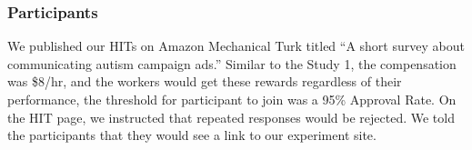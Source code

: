
\subsubsection{Participants}
We published our HITs on Amazon Mechanical Turk titled ``A short survey about communicating autism campaign ads.'' Similar to the Study 1, the compensation was \$8/hr, and the workers would get these rewards regardless of their performance, the threshold for participant to join was a 95\% Approval Rate. On the HIT page, we instructed that repeated responses would be rejected. We told the participants that they would see a link to our experiment site.
